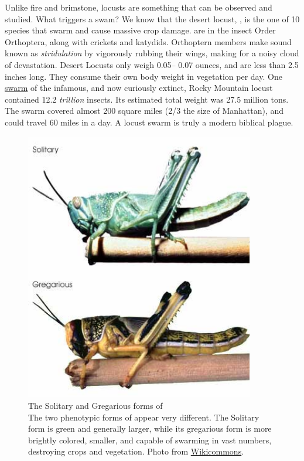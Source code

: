   Unlike fire and brimstone, locusts are something that can be observed and studied. What triggers a swam? We know that the desert locust, \locusts{}, is the one of 10 species that swarm and cause massive crop damage. \locusts{} are in the insect Order Orthoptera, along with crickets and katydids. Orthoptern members make sound known as \textit{stridulation} by vigorously rubbing their wings, making for a noisy cloud of devastation. Desert Locusts only weigh 0.05-- 0.07 ounces, and are less than 2.5 inches long. They consume their own body weight in vegetation per day. One \href{http://animaldiversity.ummz.umich.edu/site/accounts/information/Melanoplus_spretus.html}{swarm} of the infamous, and now curiously extinct, Rocky Mountain locust contained 12.2 \textit{trillion} insects. Its estimated total weight was 27.5 million tons. The swarm covered almost 200 square miles (2/3 the size of Manhattan), and could travel 60 miles in a day. A locust swarm is truly a modern biblical plague.

  \begin{figure} %
    \centering 
    \includegraphics[width=10cm,keepaspectratio]{Figures/Intro/DesertLocust.jpeg}
    \caption[The Solitary and Gregarious forms of \locusts{}]
    {
      The Solitary and Gregarious forms of \locusts{}\\[0.25cm]
      The two phenotypic forms of \locusts{} appear very different. The Solitary form is green and generally larger, while its gregarious form is more brightly colored, smaller, and capable of swarming in vast numbers, destroying crops and vegetation. Photo from \href{http://www.wikicommons.com}{Wikicommons}.
      }
    \label{Intro:fig:Locust}
    \end{figure}

